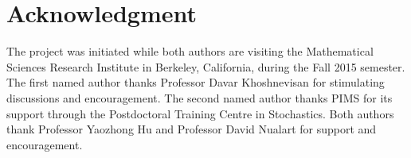 \documentclass[12pt,reqno]{amsart}
\theoremstyle{remark}
\let\Section=\section
\def\section{\setcounter{equation}{0}\Section}
\newcommand{\1}{\mathbf{1}}
\begin{document}
\section*{Acknowledgment} %
The project was initiated while both authors are visiting the Mathematical Sciences Research Institute in Berkeley, California, during the Fall 2015 semester.  The first named author thanks Professor Davar Khoshnevisan for stimulating discussions and encouragement. The second named author thanks PIMS for its support through the Postdoctoral Training Centre in Stochastics. Both authors thank Professor Yaozhong Hu and Professor David Nualart for support and encouragement. 














%  
% 

\end{document}
